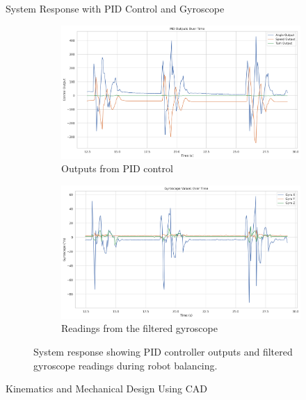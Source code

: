 \documentclass[final]{beamer}
\newlength{\colwidth}
\begin{document}
\begin{frame}[t]
\begin{columns}[t]
\begin{column}{\colwidth}
\begin{block}{System Response with PID Control and Gyroscope}	
\begin{figure}[h!]
    \centering
    \begin{subfigure}[t]{0.48\textwidth}
        \centering
        \includegraphics[width=\linewidth]{logos/pid_outputs_.png}
        \caption{Outputs from PID control}
        \label{fig:comp_filter}
    \end{subfigure}
    \hfill
    \begin{subfigure}[t]{0.48\textwidth}
        \centering
        \includegraphics[width=\linewidth]{logos/gyro_values_.png}
        \caption{Readings from the filtered gyroscope}
        \label{fig:kalman_filter}
    \end{subfigure}
    \caption{System response showing PID controller outputs and filtered gyroscope readings during robot balancing.}
    \label{fig:filters}
\end{figure}
  \end{block}
  \begin{block}{Kinematics and Mechanical Design Using CAD}


\end{block}
\end{column}
\end{columns}
\end{frame}
\end{document}
